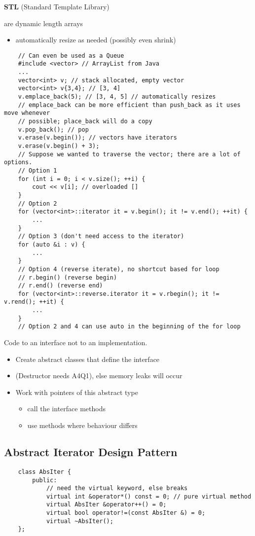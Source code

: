 \textbf{STL} (Standard Template Library)

 are dynamic length arrays
\begin{itemize}
    \item automatically resize as needed (possibly even shrink)
\end{itemize}

\begin{lstlisting}
    // Can even be used as a Queue
    #include <vector> // ArrayList from Java
    ...
    vector<int> v; // stack allocated, empty vector
    vector<int> v{3,4}; // [3, 4]
    v.emplace_back(5); // [3, 4, 5] // automatically resizes
    // emplace_back can be more efficient than push_back as it uses move whenever
    // possible; place_back will do a copy
    v.pop_back(); // pop
    v.erase(v.begin()); // vectors have iterators
    v.erase(v.begin() + 3);
    // Suppose we wanted to traverse the vector; there are a lot of options.
    // Option 1
    for (int i = 0; i < v.size(); ++i) {
        cout << v[i]; // overloaded []
    }
    // Option 2
    for (vector<int>::iterator it = v.begin(); it != v.end(); ++it) {
        ...
    }
    // Option 3 (don't need access to the iterator)
    for (auto &i : v) {
        ...
    }
    // Option 4 (reverse iterate), no shortcut based for loop
    // r.begin() (reverse begin)
    // r.end() (reverse end)
    for (vector<int>::reverse.iterator it = v.rbegin(); it != v.rend(); ++it) {
        ...
    }
    // Option 2 and 4 can use auto in the beginning of the for loop
\end{lstlisting}

Code to an interface not to an implementation.
\begin{itemize}
    \item Create abstract classes that define the interface
    \item (Destructor needs  A4Q1), else memory leaks will occur
    \item Work with pointers of this abstract type
          \begin{itemize}
              \item call the interface methods
              \item use  methods where behaviour differs
          \end{itemize}
\end{itemize}

\subsection{Abstract Iterator Design Pattern}
\begin{lstlisting}
    class AbsIter {
        public:
            // need the virtual keyword, else breaks
            virtual int &operator*() const = 0; // pure virtual method
            virtual AbsIter &operator++() = 0;
            virtual bool operator!=(const AbsIter &) = 0;
            virtual ~AbsIter();
    };
\end{lstlisting}

